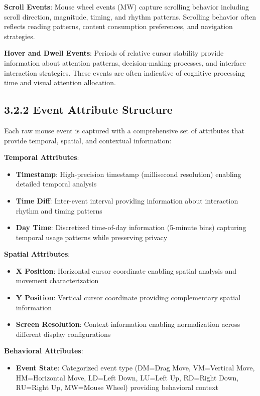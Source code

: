 \documentclass[
  12pt,
  a4paper,
]{report}
\providecommand{\tightlist}{%
  \setlength{\itemsep}{0pt}\setlength{\parskip}{0pt}}
\begin{document}
\textbf{Scroll Events}: Mouse wheel events (MW) capture scrolling
behavior including scroll direction, magnitude, timing, and rhythm
patterns. Scrolling behavior often reflects reading patterns, content
consumption preferences, and navigation strategies.

\textbf{Hover and Dwell Events}: Periods of relative cursor stability
provide information about attention patterns, decision-making processes,
and interface interaction strategies. These events are often indicative
of cognitive processing time and visual attention allocation.

\subsection{3.2.2 Event Attribute
Structure}\label{event-attribute-structure}

Each raw mouse event is captured with a comprehensive set of attributes
that provide temporal, spatial, and contextual information:

\textbf{Temporal Attributes}:

\begin{itemize}
\tightlist
\item
  \textbf{Timestamp}: High-precision timestamp (millisecond resolution)
  enabling detailed temporal analysis
\item
  \textbf{Time Diff}: Inter-event interval providing information about
  interaction rhythm and timing patterns
\item
  \textbf{Day Time}: Discretized time-of-day information (5-minute bins)
  capturing temporal usage patterns while preserving privacy
\end{itemize}

\textbf{Spatial Attributes}:

\begin{itemize}
\tightlist
\item
  \textbf{X Position}: Horizontal cursor coordinate enabling spatial
  analysis and movement characterization
\item
  \textbf{Y Position}: Vertical cursor coordinate providing
  complementary spatial information
\item
  \textbf{Screen Resolution}: Context information enabling normalization
  across different display configurations
\end{itemize}

\textbf{Behavioral Attributes}:

\begin{itemize}
\tightlist
\item
  \textbf{Event State}: Categorized event type (DM=Drag Move,
  VM=Vertical Move, HM=Horizontal Move, LD=Left Down, LU=Left Up,
  RD=Right Down, RU=Right Up, MW=Mouse Wheel) providing behavioral
  context
\end{itemize}
\end{document}
